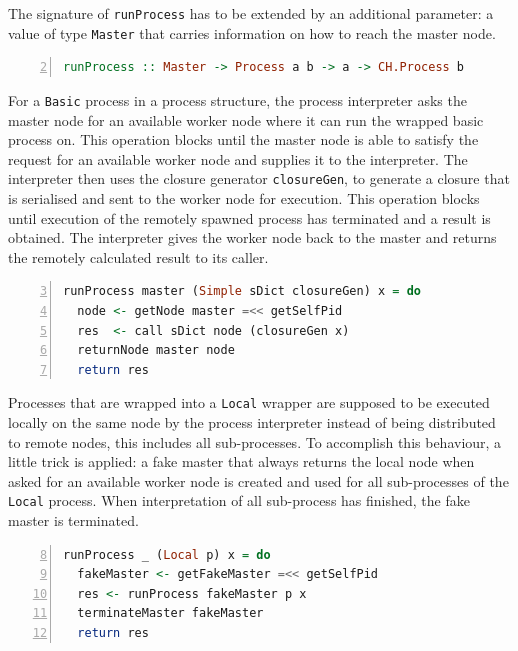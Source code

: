 The signature of \texttt{runProcess} has to be extended by an additional parameter: a value of type \texttt{Master} that carries information on how to reach the master node.
\begin{lstlisting}[language=Haskell,caption=Signature of the process interpreter.,label=lst:interpreter_signature,numbers=left,frame=bt,firstnumber=2]
runProcess :: Master -> Process a b -> a -> CH.Process b
\end{lstlisting}

For a \texttt{Basic} process in a process structure, the process interpreter asks the master node for an available worker node where it can run the wrapped basic process on. This operation blocks until the master node is able to satisfy the request for an available worker node and supplies it to the interpreter. The interpreter then uses the closure generator \texttt{closureGen}, to generate a closure that is serialised and sent to the worker node for execution. This operation blocks until execution of the remotely spawned process has terminated and a result is obtained. The interpreter gives the worker node back to the master and returns the remotely calculated result to its caller.
\begin{lstlisting}[language=Haskell,caption=Implementation of the interpreter for \texttt{Simple} processes.,label=lst:runprocess_simple,numbers=left,frame=bt,firstnumber=3]
runProcess master (Simple sDict closureGen) x = do
  node <- getNode master =<< getSelfPid
  res  <- call sDict node (closureGen x)
  returnNode master node
  return res
\end{lstlisting}

Processes that are wrapped into a \texttt{Local} wrapper are supposed to be executed locally on the same node by the process interpreter instead of being distributed to remote nodes, this includes all sub-processes. To accomplish this behaviour, a little trick is applied: a fake master that always returns the local node when asked for an available worker node is created and used for all sub-processes of the \texttt{Local} process. When interpretation of all sub-process has finished, the fake master is terminated.
\begin{lstlisting}[language=Haskell,caption=Implementation of the interpreter for \texttt{Local} processes.,label=lst:runprocess_local,numbers=left,frame=bt,firstnumber=8]
runProcess _ (Local p) x = do
  fakeMaster <- getFakeMaster =<< getSelfPid
  res <- runProcess fakeMaster p x
  terminateMaster fakeMaster
  return res
\end{lstlisting}


